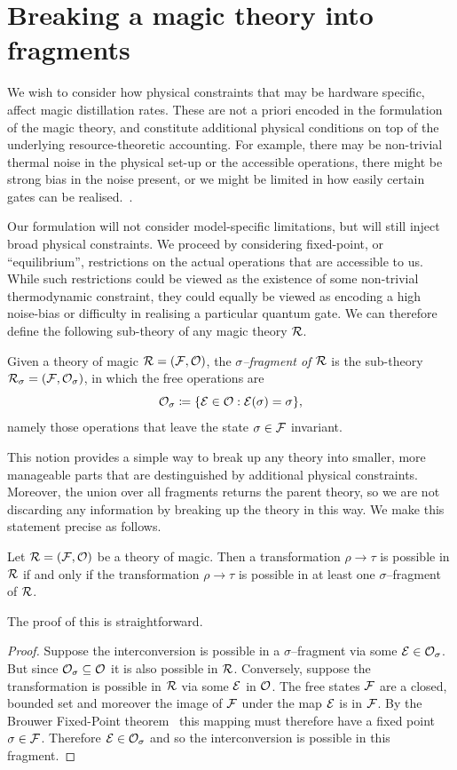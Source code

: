 \documentclass[pra,
aps,
twocolumn,
superscriptaddress,
groupedaddress,
nofootinbib,
reprint
]{revtex4-1}
\begin{document}
\section{Breaking a magic theory into fragments}
We wish to consider how physical constraints that may be hardware specific, affect magic distillation rates. These are not a priori encoded in the formulation of the magic theory, and constitute additional physical conditions on top of the underlying resource-theoretic accounting. For example, there may be non-trivial thermal noise in the physical set-up or the accessible operations, there might be strong bias in the noise present, or we might be limited in how easily certain gates can be realised.~\cite{Litinski_2019, Babbush_2018, Fowler_2019, Li_2015}.

Our formulation will not consider model-specific limitations, but will still inject broad physical constraints. We proceed by considering fixed-point, or ``equilibrium'', restrictions on the actual operations that are accessible to us. While such restrictions could be viewed as the existence of some non-trivial thermodynamic constraint, they could equally be viewed as encoding a high noise-bias or difficulty in realising a particular quantum gate. We can therefore define the following sub-theory of any magic theory $\mathcal{R}$.
\begin{definition}\label{def:sigmafrag}
   Given a theory of magic $\mathcal{R} = (\mathcal{F}, \mathcal{O})$, the \emph{$\sigma$--fragment of $\mathcal{R}$} is the sub-theory $\mathcal{R}_\sigma = (\mathcal{F}, \mathcal{O}_\sigma)$, in which the free operations are 
   \begin{equation}
        \mathcal{O}_\sigma \coloneqq \{ \mathcal{E} \in \mathcal{O}: \mathcal{E}(\sigma) = \sigma \},
    \end{equation}
namely those operations that leave the state $\sigma \in \mathcal{F}$ invariant.
\end{definition}
This notion provides a simple way to break up any theory into smaller, more manageable parts that are destinguished by additional physical constraints. Moreover, the union over all fragments returns the parent theory, so we are not discarding any information by breaking up the theory in this way. We make this statement precise as follows.
\begin{theorem}\label{thm:frag}
    Let $\mathcal{R} = (\mathcal{F}, \mathcal{O})$ be a theory of magic.
Then a transformation $\rho \longrightarrow \tau$ is possible in $\mathcal{R}$ if and only if the transformation $\rho \longrightarrow \tau$ is possible in at least one $\sigma$--fragment of $\mathcal{R}$.
\end{theorem}
The proof of this is straightforward.
\begin{proof}
    Suppose the interconversion is possible in a $\sigma$--fragment via some $\mathcal{E} \in \mathcal{O}_\sigma$. But since $\mathcal{O}_\sigma \subseteq \mathcal{O}$ it is also possible in $\mathcal{R}$. Conversely, suppose the transformation is possible in $\mathcal{R}$ via some $\mathcal{E}$ in $\mathcal{O}$. The free states $\mathcal{F}$ are a closed, bounded set and moreover the image of $\mathcal{F}$ under the map $\mathcal{E}$ is in $\mathcal{F}$. By the Brouwer Fixed-Point theorem~\cite{cit:brouwer} this mapping must therefore have a fixed point $\sigma \in \mathcal{F}$. Therefore $\mathcal{E} \in \mathcal{O}_\sigma$ and so the interconversion is possible in this fragment.
\end{proof}
\end{document}
